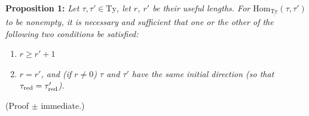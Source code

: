 \documentclass[11pt]{article}
\newcommand{\printedpage}[1]{\marginpar{\footnotesize p.~#1}}
\newcommand{\uTy}{\underline{\mathrm{Ty}}}
\newcommand{\red}{\text{\upshape red}}
\begin{document}
\textbf{Proposition 1:} \textit{Let $\tau,\tau'\in\mathrm{Ty}$, let $r$, $r'$ be their useful lengths. For $\mathrm{Hom}_{\uTy}(\tau,\tau')$ to be nonempty, it is necessary and sufficient that one or the other of the following two conditions be satisfied:}

\begin{enumerate}[label={}, leftmargin=*]
\item[\textit{a)}] $r\geq r'+1$

\printedpage{55}

\item[\textit{b)}] \textit{$r=r'$, and (if $r\neq0$) $\tau$ and $\tau'$ have the same initial direction (so that $\tau_{\red}=\tau'_{\red}$).}
\end{enumerate}

(Proof $\pm$ immediate.)
\end{document}

